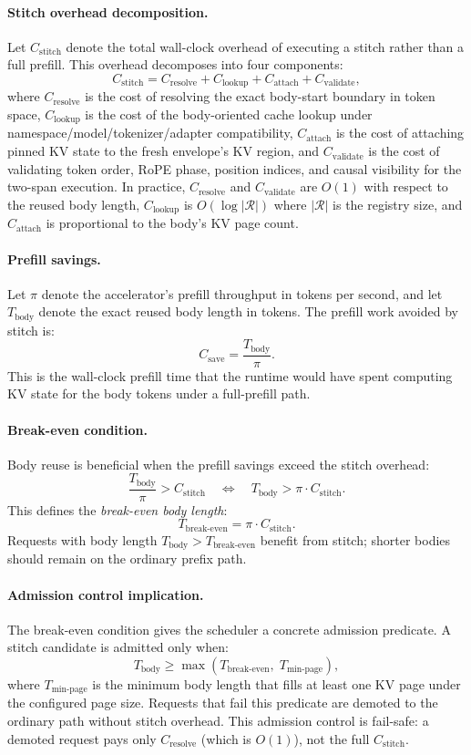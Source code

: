 \documentclass[conference]{IEEEtran}
\begin{document}
\paragraph{Stitch overhead decomposition.}
Let $C_{\text{stitch}}$ denote the total wall-clock overhead of executing a stitch rather than a full prefill. This overhead decomposes into four components:
\[
C_{\text{stitch}} = C_{\text{resolve}} + C_{\text{lookup}} + C_{\text{attach}} + C_{\text{validate}},
\]
where $C_{\text{resolve}}$ is the cost of resolving the exact body-start boundary in token space, $C_{\text{lookup}}$ is the cost of the body-oriented cache lookup under namespace/model/tokenizer/adapter compatibility, $C_{\text{attach}}$ is the cost of attaching pinned KV state to the fresh envelope's KV region, and $C_{\text{validate}}$ is the cost of validating token order, RoPE phase, position indices, and causal visibility for the two-span execution. In practice, $C_{\text{resolve}}$ and $C_{\text{validate}}$ are $O(1)$ with respect to the reused body length, $C_{\text{lookup}}$ is $O(\log |\mathcal{R}|)$ where $|\mathcal{R}|$ is the registry size, and $C_{\text{attach}}$ is proportional to the body's KV page count.

\paragraph{Prefill savings.}
Let $\pi$ denote the accelerator's prefill throughput in tokens per second, and let $T_{\text{body}}$ denote the exact reused body length in tokens. The prefill work avoided by stitch is:
\[
C_{\text{save}} = \frac{T_{\text{body}}}{\pi}.
\]
This is the wall-clock prefill time that the runtime would have spent computing KV state for the body tokens under a full-prefill path.

\paragraph{Break-even condition.}
Body reuse is beneficial when the prefill savings exceed the stitch overhead:
\[
\frac{T_{\text{body}}}{\pi} > C_{\text{stitch}} \quad \Longleftrightarrow \quad T_{\text{body}} > \pi \cdot C_{\text{stitch}}.
\]
This defines the \emph{break-even body length}:
\[
T_{\text{break-even}} = \pi \cdot C_{\text{stitch}}.
\]
Requests with body length $T_{\text{body}} > T_{\text{break-even}}$ benefit from stitch; shorter bodies should remain on the ordinary prefix path.

\paragraph{Admission control implication.}
The break-even condition gives the scheduler a concrete admission predicate. A stitch candidate is admitted only when:
\[
T_{\text{body}} \geq \max\left(T_{\text{break-even}},\; T_{\text{min-page}}\right),
\]
where $T_{\text{min-page}}$ is the minimum body length that fills at least one KV page under the configured page size. Requests that fail this predicate are demoted to the ordinary path without stitch overhead. This admission control is fail-safe: a demoted request pays only $C_{\text{resolve}}$ (which is $O(1)$), not the full $C_{\text{stitch}}$.
\end{document}

